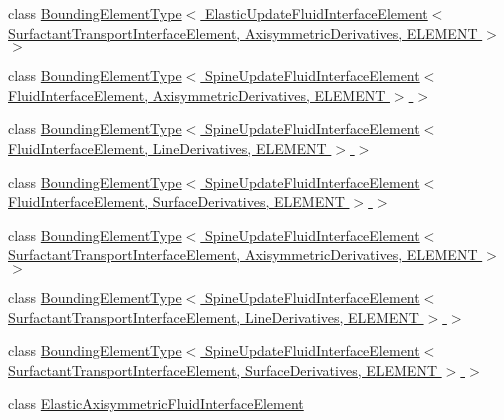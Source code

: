 \begin{DoxyCompactItemize}
\item 
class \hyperlink{classoomph_1_1BoundingElementType_3_01ElasticUpdateFluidInterfaceElement_3_01SurfactantTransportdc53e7a70087d96a28c80f422fe03679}{Bounding\+Element\+Type$<$ Elastic\+Update\+Fluid\+Interface\+Element$<$ Surfactant\+Transport\+Interface\+Element, Axisymmetric\+Derivatives, E\+L\+E\+M\+E\+N\+T $>$ $>$}
\item 
class \hyperlink{classoomph_1_1BoundingElementType_3_01SpineUpdateFluidInterfaceElement_3_01FluidInterfaceElement7e4c3b8d4bf0b8ea24b4420ab41b2522}{Bounding\+Element\+Type$<$ Spine\+Update\+Fluid\+Interface\+Element$<$ Fluid\+Interface\+Element, Axisymmetric\+Derivatives, E\+L\+E\+M\+E\+N\+T $>$ $>$}
\item 
class \hyperlink{classoomph_1_1BoundingElementType_3_01SpineUpdateFluidInterfaceElement_3_01FluidInterfaceElement0079ff469c68e949ddcf7a17f32ba6a9}{Bounding\+Element\+Type$<$ Spine\+Update\+Fluid\+Interface\+Element$<$ Fluid\+Interface\+Element, Line\+Derivatives, E\+L\+E\+M\+E\+N\+T $>$ $>$}
\item 
class \hyperlink{classoomph_1_1BoundingElementType_3_01SpineUpdateFluidInterfaceElement_3_01FluidInterfaceElement967a9cdd4c55a2ab80dbfbe6be84b5ab}{Bounding\+Element\+Type$<$ Spine\+Update\+Fluid\+Interface\+Element$<$ Fluid\+Interface\+Element, Surface\+Derivatives, E\+L\+E\+M\+E\+N\+T $>$ $>$}
\item 
class \hyperlink{classoomph_1_1BoundingElementType_3_01SpineUpdateFluidInterfaceElement_3_01SurfactantTransportIn96bc27501b38520de44b2adcd1d39239}{Bounding\+Element\+Type$<$ Spine\+Update\+Fluid\+Interface\+Element$<$ Surfactant\+Transport\+Interface\+Element, Axisymmetric\+Derivatives, E\+L\+E\+M\+E\+N\+T $>$ $>$}
\item 
class \hyperlink{classoomph_1_1BoundingElementType_3_01SpineUpdateFluidInterfaceElement_3_01SurfactantTransportIn1a79ed5e636f8826f4a8a00ba9f037b4}{Bounding\+Element\+Type$<$ Spine\+Update\+Fluid\+Interface\+Element$<$ Surfactant\+Transport\+Interface\+Element, Line\+Derivatives, E\+L\+E\+M\+E\+N\+T $>$ $>$}
\item 
class \hyperlink{classoomph_1_1BoundingElementType_3_01SpineUpdateFluidInterfaceElement_3_01SurfactantTransportIn0aa155ddfcfcc4520e061f144b3ee14d}{Bounding\+Element\+Type$<$ Spine\+Update\+Fluid\+Interface\+Element$<$ Surfactant\+Transport\+Interface\+Element, Surface\+Derivatives, E\+L\+E\+M\+E\+N\+T $>$ $>$}
\item 
class \hyperlink{classoomph_1_1ElasticAxisymmetricFluidInterfaceElement}{Elastic\+Axisymmetric\+Fluid\+Interface\+Element}

\end{DoxyCompactItemize}
